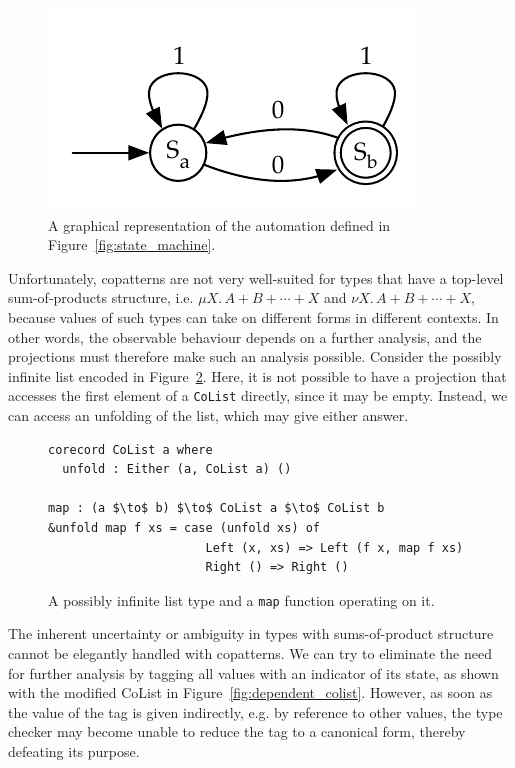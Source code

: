 \begin{figure}[h]
\centering
\includegraphics{figures/dfa}
\caption{A graphical representation of the automation defined in
  Figure~\ref{fig:state_machine}.}
\label{fig:state_machine_graphical}
\end{figure}

Unfortunately, copatterns are not very well-suited for types that have a top-level
sum-of-products structure, i.e. ${\mu X.\,A + B + \cdots + X}$ and
${\nu X.\,A + B + \cdots + X}$, because values of such types can take on
different forms in different contexts. In other words, the observable behaviour
depends on a further analysis, and the projections must therefore make
such an analysis possible. Consider the possibly infinite list encoded in
Figure~\ref{fig:colist}. Here, it is not possible to have a projection that
accesses the first element of a \texttt{CoList} directly, since it may be
empty. Instead, we can access an unfolding of the list, which may give either
answer.

\begin{figure}[h]
\begin{lstlisting}[mathescape]
corecord CoList a where
  unfold : Either (a, CoList a) ()

map : (a $\to$ b) $\to$ CoList a $\to$ CoList b 
&unfold map f xs = case (unfold xs) of
                      Left (x, xs) => Left (f x, map f xs)
                      Right () => Right ()
\end{lstlisting}
  \caption{A possibly infinite list type and a \texttt{map} function operating on it.}
  \label{fig:colist}
\end{figure}

The inherent uncertainty or ambiguity in types with sums-of-product structure
cannot be elegantly handled with copatterns. We can try to eliminate the need
for further analysis by tagging all values with an indicator of its state, as
shown with the modified CoList in Figure~\ref{fig:dependent_colist}. However, as
soon as the value of the tag is given indirectly, e.g. by reference to other values,
the type checker may become unable to reduce the tag to a canonical form, thereby
defeating its purpose.

